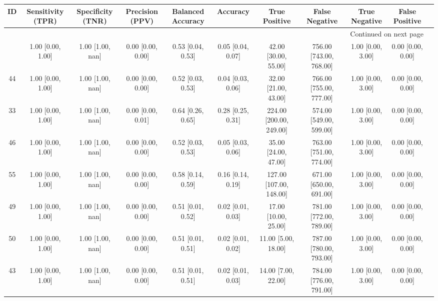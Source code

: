 \documentclass[8pt]{article}
\begin{document}
\begin{center}
\begin{footnotesize}
\begin{longtable}{|ccccccccccc|}
\toprule
 ID &  Sensitivity (TPR) & Specificity (TNR) &    Precision (PPV) &  Balanced Accuracy &           Accuracy &            True Positive &           False Negative &      True Negative &     False Positive \\
\midrule
\endhead
\midrule
\multicolumn{10}{r}{{Continued on next page}} \\
\midrule
\endfoot

\bottomrule
\endlastfoot
 45 &  1.00 [0.00, 1.00] &  1.00 [1.00, nan] &  0.00 [0.00, 0.00] &  0.53 [0.04, 0.53] &  0.05 [0.04, 0.07] &     42.00 [30.00, 55.00] &  756.00 [743.00, 768.00] &  1.00 [0.00, 3.00] &  0.00 [0.00, 0.00] \\
 44 &  1.00 [0.00, 1.00] &  1.00 [1.00, nan] &  0.00 [0.00, 0.00] &  0.52 [0.03, 0.53] &  0.04 [0.03, 0.06] &     32.00 [21.00, 43.00] &  766.00 [755.00, 777.00] &  1.00 [0.00, 3.00] &  0.00 [0.00, 0.00] \\
 33 &  1.00 [0.00, 1.00] &  1.00 [1.00, nan] &  0.00 [0.00, 0.01] &  0.64 [0.26, 0.65] &  0.28 [0.25, 0.31] &  224.00 [200.00, 249.00] &  574.00 [549.00, 599.00] &  1.00 [0.00, 3.00] &  0.00 [0.00, 0.00] \\
 46 &  1.00 [0.00, 1.00] &  1.00 [1.00, nan] &  0.00 [0.00, 0.00] &  0.52 [0.03, 0.53] &  0.05 [0.03, 0.06] &     35.00 [24.00, 47.00] &  763.00 [751.00, 774.00] &  1.00 [0.00, 3.00] &  0.00 [0.00, 0.00] \\
 55 &  1.00 [0.00, 1.00] &  1.00 [1.00, nan] &  0.00 [0.00, 0.00] &  0.58 [0.14, 0.59] &  0.16 [0.14, 0.19] &  127.00 [107.00, 148.00] &  671.00 [650.00, 691.00] &  1.00 [0.00, 3.00] &  0.00 [0.00, 0.00] \\
 49 &  1.00 [0.00, 1.00] &  1.00 [1.00, nan] &  0.00 [0.00, 0.00] &  0.51 [0.01, 0.52] &  0.02 [0.01, 0.03] &     17.00 [10.00, 25.00] &  781.00 [772.00, 789.00] &  1.00 [0.00, 3.00] &  0.00 [0.00, 0.00] \\
 50 &  1.00 [0.00, 1.00] &  1.00 [1.00, nan] &  0.00 [0.00, 0.00] &  0.51 [0.01, 0.51] &  0.02 [0.01, 0.02] &      11.00 [5.00, 18.00] &  787.00 [780.00, 793.00] &  1.00 [0.00, 3.00] &  0.00 [0.00, 0.00] \\
 43 &  1.00 [0.00, 1.00] &  1.00 [1.00, nan] &  0.00 [0.00, 0.00] &  0.51 [0.01, 0.51] &  0.02 [0.01, 0.03] &      14.00 [7.00, 22.00] &  784.00 [776.00, 791.00] &  1.00 [0.00, 3.00] &  0.00 [0.00, 0.00] \\

\end{longtable}
\end{footnotesize}
\end{center}
\end{document}

